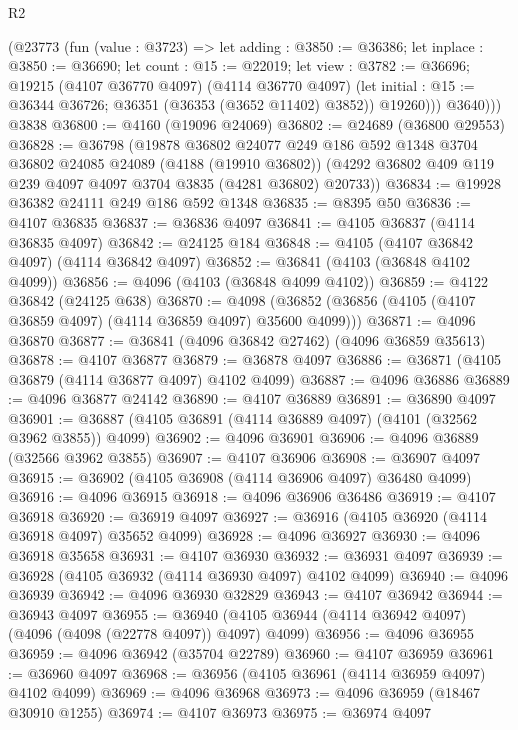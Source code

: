 \begin{lexlean}{R2}
\begin{coremodule}
          (@23773
            (fun (value : @3723) =>
            let adding : @3850 := @36386;
            let inplace : @3850 := @36690;
            let count : @15 := @22019;
            let view : @3782 := @36696;
            @19215
              (@4107 @36770 @4097)
              (@4114 @36770 @4097)
              (let initial : @15 := @36344 @36726; @36351 (@36353 (@3652 @11402) @3852))
              @19260)))
          @3640)))
    @3838
@36800 := @4160 (@19096 @24069)
@36802 := @24689 (@36800 @29553)
@36828 := @36798
    (@19878
      @36802
      @24077
      @249
      @186
      @592
      @1348
      @3704
      @36802
      @24085
      @24089
      (@4188 (@19910 @36802))
      (@4292 @36802 @409 @119 @239 @4097 @4097 @3704 @3835 (@4281 @36802) @20733))
@36834 := @19928 @36382 @24111 @249 @186 @592 @1348
@36835 := @8395 @50
@36836 := @4107 @36835
@36837 := @36836 @4097
@36841 := @4105 @36837 (@4114 @36835 @4097)
@36842 := @24125 @184
@36848 := @4105 (@4107 @36842 @4097) (@4114 @36842 @4097)
@36852 := @36841 (@4103 (@36848 @4102 @4099))
@36856 := @4096 (@4103 (@36848 @4099 @4102))
@36859 := @4122 @36842 (@24125 @638)
@36870 := @4098 (@36852 (@36856 (@4105 (@4107 @36859 @4097) (@4114 @36859 @4097) @35600 @4099)))
@36871 := @4096 @36870
@36877 := @36841 (@4096 @36842 @27462) (@4096 @36859 @35613)
@36878 := @4107 @36877
@36879 := @36878 @4097
@36886 := @36871 (@4105 @36879 (@4114 @36877 @4097) @4102 @4099)
@36887 := @4096 @36886
@36889 := @4096 @36877 @24142
@36890 := @4107 @36889
@36891 := @36890 @4097
@36901 := @36887 (@4105 @36891 (@4114 @36889 @4097) (@4101 (@32562 @3962 @3855)) @4099)
@36902 := @4096 @36901
@36906 := @4096 @36889 (@32566 @3962 @3855)
@36907 := @4107 @36906
@36908 := @36907 @4097
@36915 := @36902 (@4105 @36908 (@4114 @36906 @4097) @36480 @4099)
@36916 := @4096 @36915
@36918 := @4096 @36906 @36486
@36919 := @4107 @36918
@36920 := @36919 @4097
@36927 := @36916 (@4105 @36920 (@4114 @36918 @4097) @35652 @4099)
@36928 := @4096 @36927
@36930 := @4096 @36918 @35658
@36931 := @4107 @36930
@36932 := @36931 @4097
@36939 := @36928 (@4105 @36932 (@4114 @36930 @4097) @4102 @4099)
@36940 := @4096 @36939
@36942 := @4096 @36930 @32829
@36943 := @4107 @36942
@36944 := @36943 @4097
@36955 := @36940 (@4105 @36944 (@4114 @36942 @4097) (@4096 (@4098 (@22778 @4097)) @4097) @4099)
@36956 := @4096 @36955
@36959 := @4096 @36942 (@35704 @22789)
@36960 := @4107 @36959
@36961 := @36960 @4097
@36968 := @36956 (@4105 @36961 (@4114 @36959 @4097) @4102 @4099)
@36969 := @4096 @36968
@36973 := @4096 @36959 (@18467 @30910 @1255)
@36974 := @4107 @36973
@36975 := @36974 @4097

\end{coremodule}
\end{lexlean}
